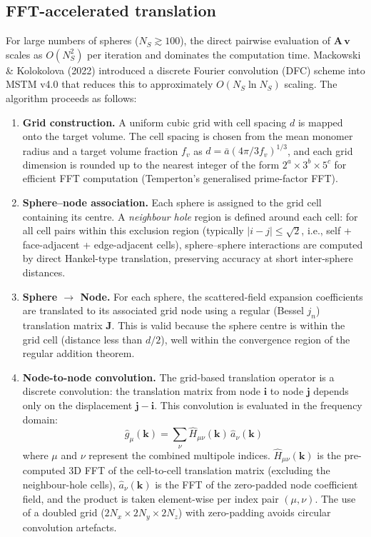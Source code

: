 \documentclass[11pt,a4paper]{article}
\begin{document}
\subsection{FFT-accelerated translation}

For large numbers of spheres ($N_S \gtrsim 100$), the direct pairwise evaluation of $\mathbf{A}\,\bm{v}$ scales as $O(N_S^2)$ per iteration and dominates the computation time.
Mackowski \& Kolokolova (2022) introduced a discrete Fourier convolution (DFC) scheme into MSTM v4.0 that reduces this to approximately $O(N_S \ln N_S)$ scaling.
The algorithm proceeds as follows:

\begin{enumerate}[nosep]
  \item \textbf{Grid construction.}
  A uniform cubic grid with cell spacing $d$ is mapped onto the target volume.
  The cell spacing is chosen from the mean monomer radius and a target volume fraction $f_v$ as $d = \bar{a} \left(4\pi / 3 f_v\right)^{1/3}$, and each grid dimension is rounded up to the nearest integer of the form $2^a \times 3^b \times 5^c$ for efficient FFT computation (Temperton's generalised prime-factor FFT).

  \item \textbf{Sphere--node association.}
  Each sphere is assigned to the grid cell containing its centre.
  A \emph{neighbour hole} region is defined around each cell: for all cell pairs within this exclusion region (typically $|i - j| \leq \sqrt{2}$, i.e., self + face-adjacent + edge-adjacent cells), sphere--sphere interactions are computed by direct Hankel-type translation, preserving accuracy at short inter-sphere distances.

  \item \textbf{Sphere $\to$ Node.}
  For each sphere, the scattered-field expansion coefficients are translated to its associated grid node using a regular (Bessel $j_n$) translation matrix $\mathbf{J}$.
  This is valid because the sphere centre is within the grid cell (distance less than $d/2$), well within the convergence region of the regular addition theorem.

  \item \textbf{Node-to-node convolution.}
  The grid-based translation operator is a discrete convolution: the translation matrix from node $\bm{i}$ to node $\bm{j}$ depends only on the displacement $\bm{j} - \bm{i}$.
  This convolution is evaluated in the frequency domain:
  \begin{equation}
    \hat{g}_\mu(\bm{k}) = \sum_\nu \hat{H}_{\mu\nu}(\bm{k})\,\hat{a}_\nu(\bm{k})
    \label{eq:fft-convolution}
  \end{equation}
  where $\mu$ and $\nu$ represent the combined multipole indices.
  $\hat{H}_{\mu\nu}(\bm{k})$ is the pre-computed 3D FFT of the cell-to-cell translation matrix (excluding the neighbour-hole cells), $\hat{a}_\nu(\bm{k})$ is the FFT of the zero-padded node coefficient field, and the product is taken element-wise per index pair $(\mu, \nu)$.
  The use of a doubled grid ($2N_x \times 2N_y \times 2N_z$) with zero-padding avoids circular convolution artefacts.


\end{enumerate}
\end{document}
